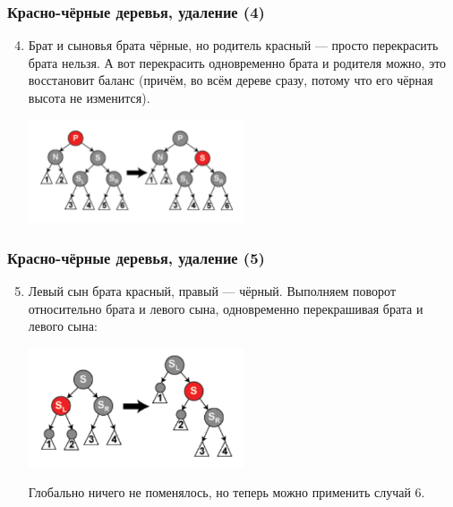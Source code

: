 \documentclass{../../slides-style}
\begin{document}
    \begin{frame}
        \frametitle{Красно-чёрные деревья, удаление (4)}
        \begin{enumerate}
            \setcounter{enumi}{3}
            \item Брат и сыновья брата чёрные, но родитель красный --- просто перекрасить брата нельзя. А вот перекрасить одновременно брата и родителя можно, это восстановит баланс (причём, во всём дереве сразу, потому что его чёрная высота не изменится).
            \begin{center}
                \includegraphics[width=0.5\textwidth]{deletion-from-red-black-tree3.png}
            \end{center}
        \end{enumerate}
    \end{frame}

    \begin{frame}
        \frametitle{Красно-чёрные деревья, удаление (5)}
        \begin{enumerate}
            \setcounter{enumi}{4}
            \item Левый сын брата красный, правый --- чёрный. Выполняем поворот относительно брата и левого сына, одновременно перекрашивая брата и левого сына:
            \begin{center}
                \includegraphics[width=0.5\textwidth]{deletion-from-red-black-tree4.png}
            \end{center}
            Глобально ничего не поменялось, но теперь можно применить случай 6.
        \end{enumerate}
    \end{frame}
\end{document}
